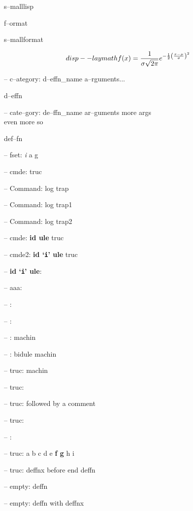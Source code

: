 \documentclass{book}
\begin{document}
s--malllisp




f--ormat




s--mallformat




$$
disp--laymath
f(x) = {1 \over \sigma \sqrt{2\pi}}e^{-{1 \over 2}\left({x-\mu \over \sigma}\right)^2}
$$


\hbox{}-- c--ategory: d--effn\_name a--rguments...


d--effn




\hbox{}-- cate--gory: de--ffn\_name ar--guments    more args \leavevmode{}\\ even more so


def--fn




\hbox{}-- fset: \emph{i} a g




\hbox{}-- cmde: truc 


\hbox{}-- Command: log trap 


\hbox{}-- Command: log trap1 


\hbox{}-- Command: log trap2 


\hbox{}-- cmde: \textbf{id ule} truc


\hbox{}-- cmde2: \textbf{id `\texttt{i}' ule} truc


\hbox{}-- \textbf{id `\texttt{i}' ule}: 



\hbox{}-- aaa: 


\hbox{}-- : 


\hbox{}-- : 


\hbox{}-- : machin


\hbox{}-- : bidule machin


\hbox{}-- truc: machin


\hbox{}-- truc: 


\hbox{}-- truc: followed by a comment




\hbox{}-- truc: 


\hbox{}-- : 


\hbox{}-- truc: a b c d e \textbf{f g} h i


\hbox{}-- truc: deffnx before end deffn




\hbox{}-- empty: deffn




\hbox{}-- empty: deffn with deffnx
\end{document}
